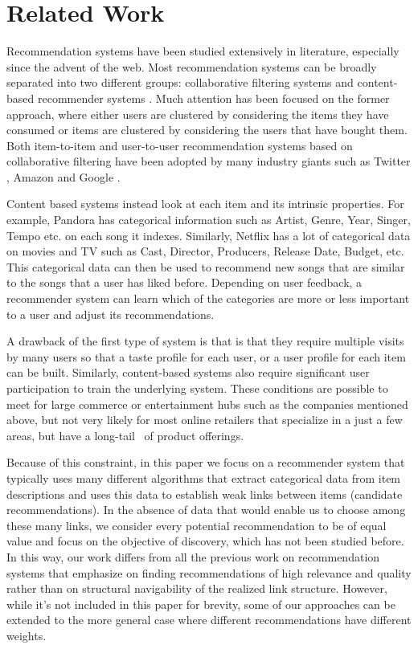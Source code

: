 \section{Related Work}

Recommendation systems have been studied extensively in literature, especially since the advent of the web. Most recommendation systems can be broadly separated into two different groups: collaborative filtering systems and content-based recommender systems \cite{almazro2010survey}. Much attention has been focused on the former approach, where either users are clustered by considering the items they have consumed or items are clustered by considering the users that have bought them. Both item-to-item and user-to-user recommendation systems based on collaborative filtering have been adopted by many industry giants such as Twitter \cite{twitter-collab-filtering}, Amazon \cite{amazon-collab-filtering} and Google \cite{google-collab-filtering}.  \vs

Content based systems instead look at each item and its intrinsic properties. For example, Pandora has categorical information such as Artist, Genre, Year, Singer, Tempo etc. on each song it indexes. Similarly, Netflix has a lot of categorical data on movies and TV such as Cast, Director, Producers, Release Date, Budget, etc. This categorical data can then be used to recommend new songs that are similar to the songs that a user has liked before. Depending on user feedback, a recommender system can learn which of the categories are more or less important to a user and adjust its recommendations. \vs

A drawback of the first type of system is that is that they require multiple visits by many users so that a taste profile for each user, or a user profile for each item can be built. 
Similarly, content-based systems also require significant user participation to train the underlying system. These conditions are possible to meet for large commerce or entertainment hubs such as the companies mentioned above, but not very likely for most online retailers that specialize in a just a few areas, but have a long-tail~\cite{Anderson2006} of product offerings. \vs

Because of this constraint, in this paper we focus on a recommender system that typically uses many different algorithms that extract categorical data from item descriptions and uses this data to establish weak links between items (candidate recommendations). In the absence of data that would enable us to choose among these many links, we consider every potential recommendation to be of equal value and focus on the objective of discovery, which has not been studied before. In this way, our work differs from all the previous work on recommendation systems that emphasize on finding recommendations of high relevance and quality rather than on structural navigability of the realized link structure. However, while it's not included in this paper for brevity, some of our approaches can be extended to the more general case where different recommendations have different weights. \vs

